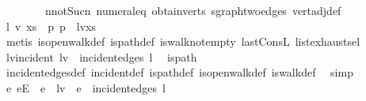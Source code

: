 \begin{isabellebody}
\ \ \ \ \ \ \ \ n{\isacharunderscore}{\kern0pt}not{\isacharunderscore}{\kern0pt}Suc{\isacharunderscore}{\kern0pt}n\ numeral{\isacharunderscore}{\kern0pt}{}{\isacharunderscore}{\kern0pt}eq{\isacharunderscore}{\kern0pt}{}\ obtain{\isacharunderscore}{\kern0pt}{}{\isacharunderscore}{\kern0pt}verts\ sgraph{\isachardot}{\kern0pt}two{\isacharunderscore}{\kern0pt}edges\ vert{\isacharunderscore}{\kern0pt}adj{\isacharunderscore}{\kern0pt}def{\isacharparenright}{\kern0pt}\isanewline
\ \ \isamarkupfalse%
\ \isamarkupfalse%
\ l\ v\ xs\ \ p{\isacharcolon}{\kern0pt}\ {\isachardoublequoteopen}p\ {\isacharequal}{\kern0pt}\ l{\isacharhash}{\kern0pt}v{\isacharhash}{\kern0pt}xs{\isachardoublequoteclose}\isanewline
\ \ \ \ \isamarkupfalse%
\ {\isacharparenleft}{\kern0pt}metis\ is{\isacharunderscore}{\kern0pt}open{\isacharunderscore}{\kern0pt}walk{\isacharunderscore}{\kern0pt}def\ is{\isacharunderscore}{\kern0pt}path{\isacharunderscore}{\kern0pt}def\ is{\isacharunderscore}{\kern0pt}walk{\isacharunderscore}{\kern0pt}not{\isacharunderscore}{\kern0pt}empty{}\ last{\isacharunderscore}{\kern0pt}ConsL\ list{\isachardot}{\kern0pt}exhaust{\isacharunderscore}{\kern0pt}sel{\isacharparenright}{\kern0pt}\isanewline
\ \ \isamarkupfalse%
\ \isamarkupfalse%
\ lv{\isacharunderscore}{\kern0pt}incident{\isacharcolon}{\kern0pt}\ {\isachardoublequoteopen}{\isacharbraceleft}{\kern0pt}l{\isacharcomma}{\kern0pt}v{\isacharbraceright}{\kern0pt}\ {\isasymin}\ incident{\isacharunderscore}{\kern0pt}edges\ l{\isachardoublequoteclose}\ \isamarkupfalse%
\ is{\isacharunderscore}{\kern0pt}path\isanewline
\ \ \ \ \isamarkupfalse%
\ incident{\isacharunderscore}{\kern0pt}edges{\isacharunderscore}{\kern0pt}def\ incident{\isacharunderscore}{\kern0pt}def\ is{\isacharunderscore}{\kern0pt}path{\isacharunderscore}{\kern0pt}def\ is{\isacharunderscore}{\kern0pt}open{\isacharunderscore}{\kern0pt}walk{\isacharunderscore}{\kern0pt}def\ is{\isacharunderscore}{\kern0pt}walk{\isacharunderscore}{\kern0pt}def\ \isamarkupfalse%
\ simp\isanewline
\ \ \isamarkupfalse%
\ {\isachardoublequoteopen}{\isasymAnd}e{\isachardot}{\kern0pt}\ e{\isasymin}E\ {\isasymLongrightarrow}\ e\ {\isasymnoteq}\ {\isacharbraceleft}{\kern0pt}l{\isacharcomma}{\kern0pt}v{\isacharbraceright}{\kern0pt}\ {\isasymLongrightarrow}\ e\ {\isasymnotin}\ incident{\isacharunderscore}{\kern0pt}edges\ l{\isachardoublequoteclose}\isanewline
\ \ \isamarkupfalse%

\end{isabellebody}

